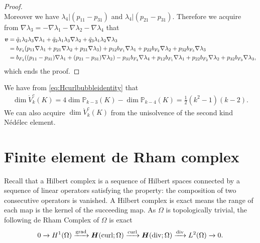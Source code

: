 \begin{proof}
\[\]
Moreover we have $\lambda_4|(p_{11}-p_{31})$ and $\lambda_4|(p_{21}-p_{31})$.
Therefore we acquire from $\nabla\lambda_{3}=-\nabla\lambda_{1}-\nabla\lambda_{2}-\nabla\lambda_{4}$ that
\begin{align*}
\boldsymbol v&=\tilde q_1\lambda_2\lambda_3\nabla\lambda_{1}+\tilde q_2\lambda_1\lambda_3\nabla\lambda_{2}+\tilde q_3\lambda_1\lambda_2\nabla\lambda_{3} \\
&=b_{F_4}(p_{11}\nabla\lambda_{1}+p_{21}\nabla\lambda_{2}+p_{31}\nabla\lambda_{3}) +p_{12}b_{F_1}\nabla\lambda_{1}+p_{22}b_{F_2}\nabla\lambda_{2}+p_{32}b_{F_3}\nabla\lambda_{3} \\
&=b_{F_4}((p_{11}-p_{31})\nabla\lambda_{1}+(p_{21}-p_{31})\nabla\lambda_{2}) - p_{31}b_{F_4}\nabla\lambda_{4} +p_{12}b_{F_1}\nabla\lambda_{1}+p_{22}b_{F_2}\nabla\lambda_{2}+p_{32}b_{F_3}\nabla\lambda_{3},
\end{align*}
which ends the proof.
\end{proof}

We have from \eqref{eq:Hcurlbubbleidentity} that
\begin{align*}
\dim\mathring V_{k}^c(K)=4\dim\mathbb P_{k-3}(K)-\dim\mathbb P_{k-4}(K)=\frac{1}{2}(k^2-1)(k-2).
\end{align*}
We can also acquire $\dim\mathring V_{k}^c(K)$ from the unisolvence of the second kind N\'ed\'elec element.

\section{Finite element de Rham complex}
Recall that a Hilbert complex is a sequence of Hilbert spaces connected by a sequence of linear operators satisfying the property: the composition of two consecutive operators is vanished. A Hilbert complex is exact means the range of each map is the kernel of the succeeding map. As $\Omega$ is topologically trivial, the following de Rham Complex of $\Omega$ is exact
\begin{equation}\label{eq:derham}
0\xrightarrow{} H^1(\Omega)\xrightarrow{\operatorname{grad}}\boldsymbol H(\operatorname{curl};\Omega)\xrightarrow{\operatorname{curl}}\boldsymbol H(\operatorname{div};\Omega)\xrightarrow{\operatorname{div}}L^2(\Omega) \xrightarrow{}0.
\end{equation}
